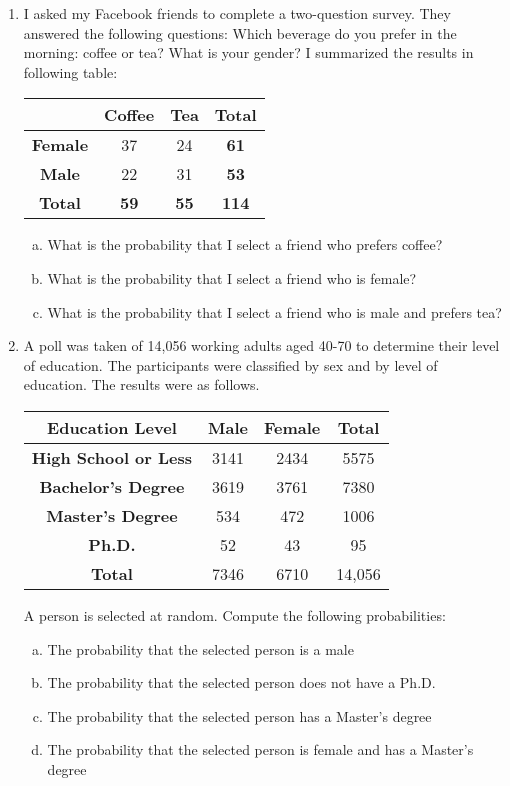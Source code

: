 \begin{enumerate}
\item I asked my Facebook friends to complete a two-question survey. They answered the following questions:
Which beverage do you prefer in the morning: coffee or tea?  What is your gender? I summarized the results in following table:
\begin{center}
\begin{tabular}{c | c c | c}
& \textbf{Coffee} & \textbf{Tea} & \textbf{Total} \\
\hline
\textbf{Female} & 37 & 24 & \textbf{61} \\
\textbf{Male} & 22 & 31 & \textbf{53} \\
\hline
\textbf{Total } & \textbf{59 }& \textbf{55} & \textbf{114}
\end{tabular}
\end{center}
\begin{enumerate}[(a)]
\item What is the probability that I select a friend who prefers coffee? 
\item What is the probability that I select a friend who is female? 
\item What is the probability that I select a friend who is male and prefers tea? 
\end{enumerate}	

\item A poll was taken of 14,056 working adults aged 40-70 to determine their level of
education. The participants were classified by sex and by level of education. The results
were as follows.
\begin{center}
\begin{tabular}{c|cc|c}
\textbf{Education Level}     &  \textbf{Male} &  \textbf{Female} &  \textbf{Total} \\ \hline
\textbf{High School or Less} & 3141  &2434     &  5575  \\ 
\textbf{Bachelor's Degree}   & 3619  &3761     &  7380  \\
\textbf{Master's Degree}     & 534   &472      &  1006  \\
\textbf{Ph.D.}               & 52    &43       &  95    \\ \hline
\textbf{Total} 							& 7346  &6710     & 14,056 \\ 
\end{tabular}
\end{center}
A person is selected at random. Compute the following probabilities:
\begin{enumerate}[(a)]
\item The probability that the selected person is a male 
\item The probability that the selected person does not have a Ph.D. 
\item The probability that the selected person has a Master's degree 
\item The probability that the selected person is female and has a Master's degree 
\end{enumerate}	
\end{enumerate}
